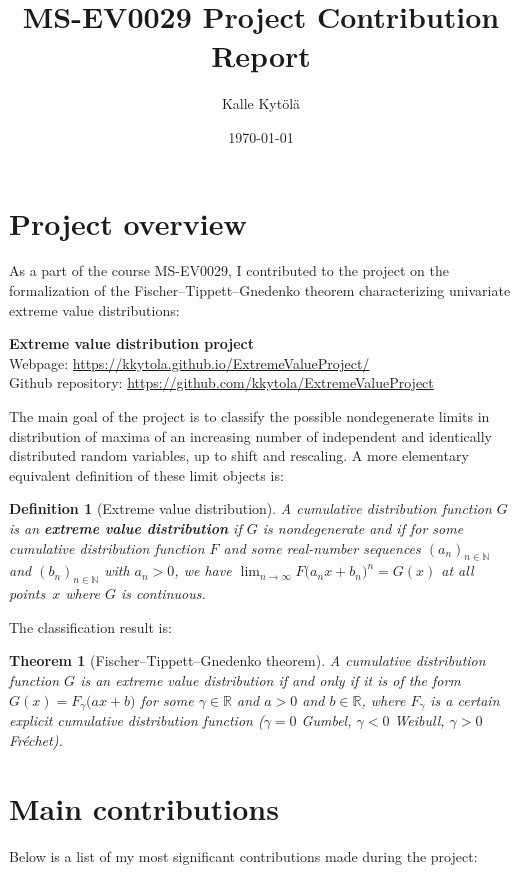 \documentclass[12pt]{article}
\title{MS-EV0029 Project Contribution Report}
\author{Kalle Kytölä}
\date{\today}
\newtheorem{definition}{Definition}
\newtheorem{theorem}{Theorem}
\begin{document}
\maketitle


\section*{Project overview}
As a part of the course MS-EV0029, I contributed to the project
on the formalization of the Fischer--Tippett--Gnedenko theorem characterizing univariate
extreme value distributions:
\begin{center}
\textbf{Extreme value distribution project} \\
Webpage: \url{https://kkytola.github.io/ExtremeValueProject/} \\
Github repository: \url{https://github.com/kkytola/ExtremeValueProject}
\end{center}

The main goal of the project is to classify the possible nondegenerate limits in distribution of maxima of an increasing number of independent and identically distributed random variables, up to shift and rescaling. A more elementary equivalent definition of these limit objects is:

\begin{definition}[Extreme value distribution]
A cumulative distribution function $G$ is an \textbf{extreme value distribution} if $G$ is nondegenerate and if for some cumulative distribution function $F$ and some real-number sequences $(a_n)_{n \in \mathbb{N}}$ and $(b_n)_{n \in \mathbb{N}}$ with $a_n>0$, we have
$\lim_{n \to \infty} F \big( a_n x + b_n \big)^n = G(x)$
at all points~$x$ where $G$ is continuous.
\end{definition}

The classification result is:

\begin{theorem}[Fischer--Tippett--Gnedenko theorem]
A cumulative distribution function $G$ is an extreme value distribution if and only if it is of the form
$G(x) = F_\gamma \big( a x + b \big)$ for some $\gamma \in \mathbb{R}$ and $a>0$ and $b \in \mathbb{R}$, where
$F_\gamma$ is a certain explicit cumulative distribution function
($\gamma=0$ Gumbel, $\gamma < 0$ Weibull, $\gamma>0$ Fr\'echet).
\end{theorem}


\section*{Main contributions}
Below is a list of my most significant contributions made during the project:
\end{document}

